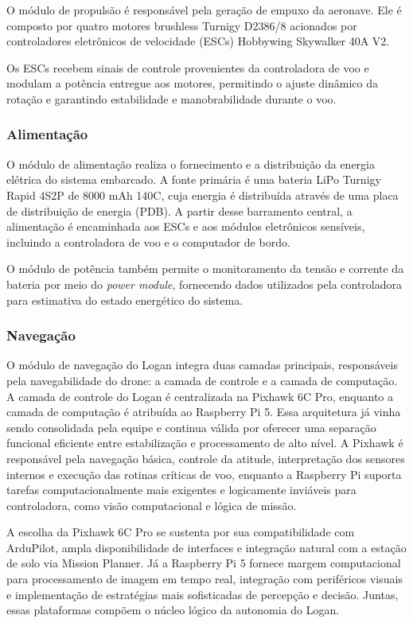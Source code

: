 O módulo de propulsão é responsável pela geração de empuxo da aeronave. Ele é composto por quatro motores brushless Turnigy D2386/8 acionados por controladores eletrônicos de velocidade (ESCs) Hobbywing Skywalker 40A V2.  

Os ESCs recebem sinais de controle provenientes da controladora de voo e modulam a potência entregue aos motores, permitindo o ajuste dinâmico da rotação e garantindo estabilidade e manobrabilidade durante o voo.

\subsubsection{Alimentação}

O módulo de alimentação realiza o fornecimento e a distribuição da energia elétrica do sistema embarcado. A fonte primária é uma bateria LiPo Turnigy Rapid  4S2P de 8000 mAh 140C, cuja energia é distribuída através de uma placa de distribuição de energia (PDB). A partir desse barramento central, a alimentação é encaminhada aos ESCs e aos módulos eletrônicos sensíveis, incluindo a controladora de voo e o computador de bordo.  

O módulo de potência também permite o monitoramento da tensão e corrente da bateria por meio do \textit{power module}, fornecendo dados utilizados pela controladora para estimativa do estado energético do sistema.

\subsubsection{Navegação}

O módulo de navegação do Logan integra duas camadas principais, responsáveis pela navegabilidade do drone: a camada de controle e a camada de computação. A camada de controle do Logan é centralizada na Pixhawk 6C Pro, enquanto a camada de computação é atribuída ao Raspberry Pi 5. Essa arquitetura já vinha sendo consolidada pela equipe e continua válida por oferecer uma separação funcional eficiente entre estabilização e processamento de alto nível. A Pixhawk é responsável pela navegação básica, controle da atitude, interpretação dos sensores internos e execução das rotinas críticas de voo, enquanto a Raspberry Pi suporta tarefas computacionalmente mais exigentes e logicamente inviáveis para controladora, como visão computacional e lógica de missão. 

A escolha da Pixhawk 6C Pro se sustenta por sua compatibilidade com ArduPilot, ampla disponibilidade de interfaces e integração natural com a estação de solo via Mission Planner. Já a Raspberry Pi 5 fornece margem computacional para processamento de imagem em tempo real, integração com periféricos visuais e implementação de estratégias mais sofisticadas de percepção e decisão. Juntas, essas plataformas compõem o núcleo lógico da autonomia do Logan. 

